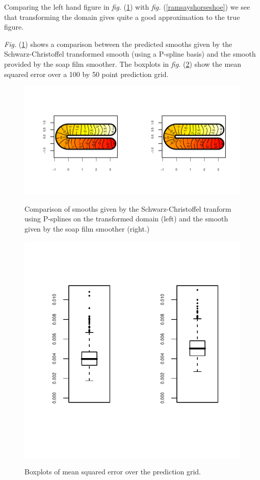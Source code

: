 \documentclass[a4paper,10pt]{amsart}
\newcommand{\sch}{Schwarz-Christoffel }
\newcommand{\fig}[1]{\emph{fig.} (\ref{#1})}
\newcommand{\Fig}[1]{\emph{Fig.} (\ref{#1})}
\begin{document}
Comparing the left hand figure in \fig{compsmooth} with \fig{ramsayshorseshoe} we see that transforming the domain gives quite a good approximation to the true figure.

\Fig{compsmooth} shows a comparison between the predicted smooths given by the \sch transformed smooth (using a P-spline basis) and the smooth provided by the soap film smoother. The boxplots in \fig{scvssoapboxplot} show the mean squared error over a 100 by 50 point prediction grid.

\begin{figure}
\centering
\includegraphics[trim=0.5in 0.5in 0in 0in]{figs/compsmooth.pdf} \\
\caption{Comparison of smooths given by the \sch tranform using P-splines on the transformed domain (left) and the smooth given by the soap film smoother (right.)}
\label{compsmooth}
\end{figure}


\begin{figure}
\centering
\includegraphics[trim=0in 1in 0in 0.1in]{figs/scvssoapboxplot.pdf} \\
\caption{Boxplots of mean squared error over the prediction grid.}
\label{scvssoapboxplot}
\end{figure}
\end{document}
